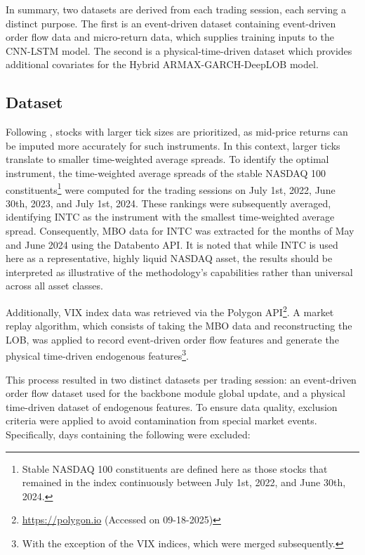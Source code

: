 \documentclass[10pt,a4paper,oneside]{article}
\begin{document}
In summary, two datasets are derived from each trading session, each serving a distinct purpose. The first is an event-driven dataset containing event-driven order flow data and micro-return data, which supplies training inputs to the CNN-LSTM model. The second is a physical-time-driven dataset which provides additional covariates for the Hybrid ARMAX-GARCH-DeepLOB model.

\subsection{Dataset}
\label{subsec:dataset}

Following \cite{briola2024deep}, stocks with larger tick sizes are prioritized, as mid-price returns can be imputed more accurately for such instruments. In this context, larger ticks translate to smaller time-weighted average spreads. To identify the optimal instrument, the time-weighted average spreads of the stable NASDAQ 100 constituents\footnote{Stable NASDAQ 100 constituents are defined here as those stocks that remained in the index continuously between July 1st, 2022, and June 30th, 2024.} were computed for the trading sessions on July 1st, 2022, June 30th, 2023, and July 1st, 2024. These rankings were subsequently averaged, identifying INTC as the instrument with the smallest time-weighted average spread. Consequently, MBO data for INTC was extracted for the months of May and June 2024 using the Databento API. It is noted that while INTC is used here as a representative, highly liquid NASDAQ asset, the results should be interpreted as illustrative of the methodology's capabilities rather than universal across all asset classes.

Additionally, VIX index data was retrieved via the Polygon API\footnote{\url{https://polygon.io} (Accessed on 09-18-2025)}. A market replay algorithm, which consists of taking the MBO data and reconstructing the LOB, was applied to record event-driven order flow features and generate the physical time-driven endogenous features\footnote{With the exception of the VIX indices, which were merged subsequently.}.

This process resulted in two distinct datasets per trading session: an event-driven order flow dataset used for the backbone module global update, and a physical time-driven dataset of endogenous features. To ensure data quality, exclusion criteria were applied to avoid contamination from special market events. Specifically, days containing the following were excluded:
\end{document}
